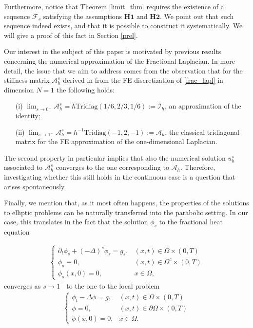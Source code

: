 \documentclass[reqno,twoside]{amsart}
\numberwithin{equation}{section}
\newcommand{\fl}[2]{(-\Delta)^#1#2}
\begin{document}
Furthermore, notice that Theorem \ref{limit_thm} requires the existence of a sequence $\mathcal{F}_s$ satisfying the assumptions $\textbf{H1}$ and $\textbf{H2}$. We point out that such sequence indeed exists, and that it is possible to construct it systematically. We will give a proof of this fact in Section \ref{prel}.

Our interest in the subject of this paper is motivated by previous results concerning the numerical approximation of the Fractional Laplacian. In more detail, the issue that we aim to address comes from the observation that for the stiffness matrix $\mathcal A_h^s$ derived in \cite{biccari2017finite} from the FE discretization of \eqref{frac_lapl} in dimension $N=1$  the following holds:
\begin{itemize}
	\item[(i)] $\lim_{s\to 0^+}\mathcal A_h^s = h\textrm{Tridiag}(1/6,2/3,1/6):=\mathcal I_h$, an approximation of the identity;
	
	\item[(ii)] $\lim_{s\to 1^-}\mathcal A_h^s = h^{-1}\textrm{Tridiag}(-1,2,-1):=\mathcal A_h$, the classical tridiagonal matrix for the FE approximation of the one-dimensional Laplacian.
\end{itemize}

The second property in particular implies that also the numerical solution $u_h^s$ associated to $\mathcal A_h^s$ converges to the one corresponding to $\mathcal A_h$. Therefore, investigating whether this still holds in the continuous case is a question that arises spontaneously. 

Finally, we mention that, as it most often happens, the properties of the solutions to elliptic problems can be naturally transferred into the parabolic setting. In our case, this translates in the fact that the solution $\phi_s$ to the fractional heat equation

\begin{align}\label{FE}
	\begin{cases}
	\partial_t\phi_s + \fl{s}{\phi_s} = g_s, &(x,t)\in\Omega\times(0,T)\tag{$\mathcal H_s$}
	\\
	\phi_s\equiv 0, & (x,t)\in\Omega^c\times(0,T)
	\\
	\phi_s(x,0) = 0, & x\in\Omega,
	\end{cases}
\end{align}
converges as $s\to 1^-$ to the one to the local problem 
\begin{align}\label{HE}
	\begin{cases}
	\phi_t -\Delta\phi = g, &(x,t)\in\Omega\times(0,T)\tag{$\mathcal H$}
	\\
	\phi= 0, & (x,t)\in\partial\Omega\times(0,T)
	\\
	\phi(x,0) = 0, & x\in\Omega.
	\end{cases}
\end{align}
\end{document}
